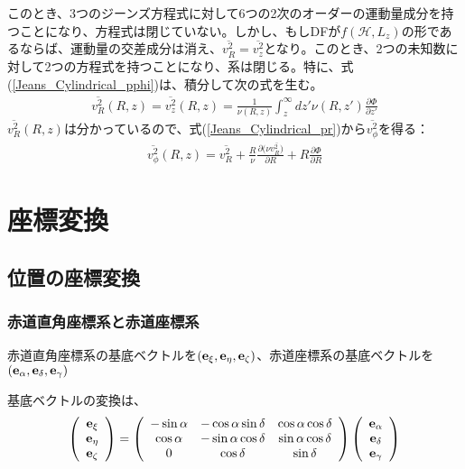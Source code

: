 このとき、3つのジーンズ方程式に対して6つの2次のオーダーの運動量成分を持つことになり、方程式は閉じていない。しかし、もしDFが$f(\mathcal{H}, L_z)$の形であるならば、運動量の交差成分は消え、$\overline{v_R^2}=\overline{v_z^2}$となり。このとき、2つの未知数に対して2つの方程式を持つことになり、系は閉じる。特に、式(\ref{Jeans_Cylindrical_pphi})は、積分して次の式を生む\cite{NM76}。
\begin{align}
	\overline{v_R^2}(R,z) = \overline{v_z^2}(R,z) = \frac{1}{\nu(R,z)}\int_z^\infty dz'\nu(R,z')\frac{\partial \Phi}{\partial z'}
\end{align}
$\overline{v_R^2}(R,z)$は分かっているので、式(\ref{Jeans_Cylindrical_pr})から$\overline{v_{\phi}^2}$を得る：
\begin{align}
	\overline{v_{\phi}^2}(R,z) = \overline{v_R^2} + \frac{R}{\nu}\frac{\partial (\nu \overline{v_R^2)}}{\partial R} + R\frac{\partial \Phi}{\partial R}
\end{align}



\section{座標変換}
\subsection{位置の座標変換}

\subsubsection{赤道直角座標系と赤道座標系}
赤道直角座標系の基底ベクトルを$({\bf e}_{\xi},{\bf e}_{\eta},{\bf e}_{\zeta})$、赤道座標系の基底ベクトルを$({\bf e}_{\alpha},{\bf e}_{\delta},{\bf e}_{\gamma})$

基底ベクトルの変換は、
\begin{align}
\begin{aligned}
    \left(
	\begin{array}{c}
	 	{\bf e}_{\xi}\\
		{\bf e}_{\eta}\\
		{\bf e}_{\zeta}
	\end{array}
	\right)
	=
	\left(
	\begin{array}{ccc}
	 	-\sin{\alpha} & -\cos{\alpha}\sin{\delta} & \cos{\alpha}\cos{\delta}\\
		\cos{\alpha} & -\sin{\alpha}\cos{\delta} & \sin{\alpha}\cos{\delta}\\
		0 & \cos{\delta} & \sin{\delta}
	\end{array}
	\right)
	\left(
	\begin{array}{c}
	 	{\bf e}_{\alpha}\\
		{\bf e}_{\delta}\\
		{\bf e}_{\gamma}
	\end{array}
	\right)
\end{aligned}
\end{align}


